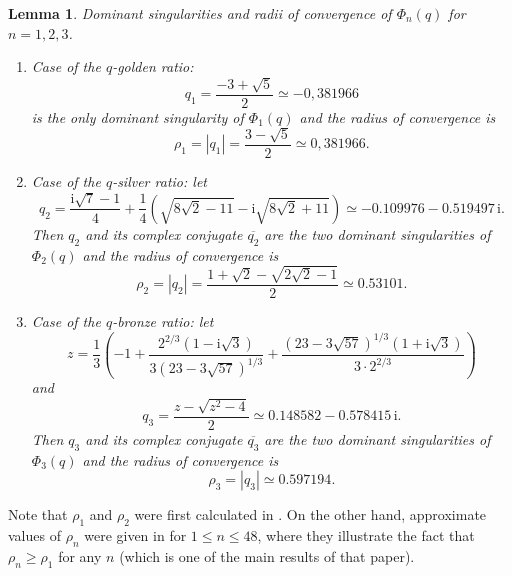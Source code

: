 \documentclass[11pt,reqno]{amsart}
\theoremstyle{plain}
\newtheorem{lemme}{Lemma}[section]
\theoremstyle{definition}
\numberwithin{figure}{section}
\numberwithin{table}{section}
\numberwithin{equation}{section}
\newcommand{\ov}[1]{\overline {#1}}
\newcommand\ip{\ensuremath{\mathrm{i}}}
\let\fr=\frac
\begin{document}
\begin{lemme}\label{lem-dominant}
\emph{Dominant singularities and radii of convergence of $\Phi_n(q)$ for $n=1,2,3$.}
\begin{enumerate}
\item Case of the $q$-golden ratio: 
\begin{equation}\label{q1gold}
q_1=\fr{-3+\sqrt{5}}2\simeq -0,381966
\end{equation} 
is the only dominant singularity of $\Phi_1(q)$ and the radius of convergence is
\begin{equation*}
\rho_1=|q_1|=\fr{3-\sqrt{5}}2\simeq 0,381966.
\end{equation*} 
\item Case of the $q$-silver ratio: let
\begin{equation}\label{q1silver}
q_2=\fr{\ip\sqrt{7}-1}{4}+\fr 1{4}\left(\sqrt{8\sqrt{2}-11}-\ip\sqrt{8\sqrt{2}+11}\right)\simeq -0.109976 - 0.519497\,\ip.
\end{equation}
Then $q_2$ and its complex conjugate $\ov {q_2}$ are the two dominant singularities of $\Phi_2(q)$ and the radius of convergence is
\begin{equation*}
\rho_2=|q_2|=\fr{1+\sqrt{2}-\sqrt{2\sqrt{2}-1}}{2}\simeq 0.53101.
\end{equation*} 
\item Case of the $q$-bronze ratio: let
\begin{equation*}
z= \fr 1{3}\left(-1+\fr{ 2^{2/3}(1-\ip\sqrt{3})}{3(23 - 3 \sqrt{57})^{1/3}}
+\fr{(23- 3 \sqrt{57})^{1/3}(1+\ip\sqrt{3})}{3\cdot 2^{2/3}}\right)
\end{equation*}
and
\begin{equation}\label{q1bronze}
q_3=\fr{z-\sqrt{z^2-4}}{2}\simeq  0.148582 - 0.578415\,\ip.
\end{equation}
Then $q_3$ and its complex conjugate $\ov {q_3}$ are the two dominant singularities of $\Phi_3(q)$ and the radius of convergence is
\begin{equation*}
\rho_3=|q_3|\simeq 0.597194.
\end{equation*} 
\end{enumerate}
\end{lemme}

Note that $\rho_1$ and $\rho_2$ were first calculated in \cite{LMGOV24}. On the other hand, approximate values of $\rho_n$ were given in \cite{Ren22} for $1≤n≤48$, where they illustrate the fact that $\rho_n≥\rho_1$ for any $n$ (which is one of the main results of that paper).
\end{document}
